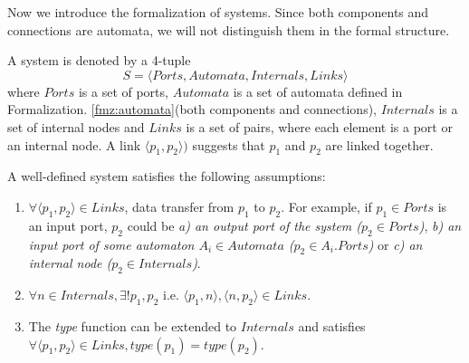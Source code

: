 Now we introduce the formalization of systems. Since both components and connections are automata, we will not distinguish them in the formal structure.

\begin{formalization}[System]
    A system is denoted by a 4-tuple
    \[
        S=\langle Ports, Automata, Internals, Links\rangle
    \] where $Ports$ is a set of ports, $Automata$ is a set of automata defined in Formalization. \ref{fmz:automata}(both components and connections), $Internals$ is a set of internal nodes and $Links$ is a set of pairs, where each element is a port or an internal node. A link $\langle p_1,p_2\rangle)$ suggests that $p_1$ and $p_2$ are linked together.
\end{formalization}
A well-defined system satisfies the following assumptions:
\begin{enumerate}
    \item $\forall \langle p_1,p_2\rangle \in Links$, data transfer from $p_1$ to $p_2$. For example, if $p_1\in Ports$ is an input port, $p_2$ could be \emph{a) an output port of the system ($p_2\in Ports$)}, \emph{b) an input port of some automaton $A_i\in Automata$ ($p_2\in A_i.Ports$)} or \emph{c) an internal node ($p_2\in Internals$)}.
    \item $\forall n\in Internals,\exists!p_1,p_2$ i.e. $\langle p_1,n\rangle ,\langle n,p_2\rangle\in Links$.
    \item The \emph{type} function can be extended to $Internals$ and satisfies $\forall \langle p_1,p_2\rangle\in Links, type(p_1)=type(p_2)$.
\end{enumerate}

\label{subsec:functions}